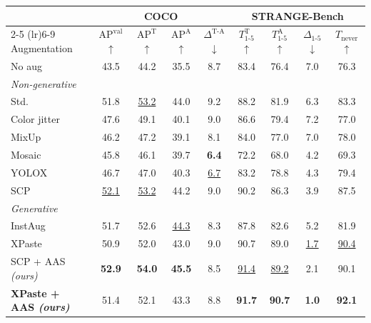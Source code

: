 \begin{tabular}{l cccc cccc}
\toprule
& \multicolumn{4}{c}{\textbf{COCO}} & \multicolumn{4}{c}{\textbf{STRANGE-Bench}} \\
\cmidrule(lr){2-5} \cmidrule(lr){6-9}
Augmentation & $\text{AP}^{\text{val}}$ $\uparrow$ & $\text{AP}^{\text{T}}$ $\uparrow$ & $\text{AP}^{\text{A}}$ $\uparrow$ & $\Delta^{\text{T-A}}$ $\downarrow$ & $T_{1\text{-}5}^{\text{T}}$ $\uparrow$ & $T_{1\text{-}5}^{\text{A}}$ $\uparrow$ & $\Delta_{1\text{-}5}$ $\downarrow$ & $T_{\text{never}}$ $\uparrow$ \\
\midrule
No aug & 43.5 & 44.2 & 35.5 & 8.7 & 83.4 & 76.4 & 7.0 & 76.3 \\
\midrule
\multicolumn{9}{l}{\emph{Non-generative}} \\
Std. & 51.8 & \underline{53.2} & 44.0 & 9.2 & 88.2 & 81.9 & 6.3 & 83.3 \\
Color jitter & 47.6 & 49.1 & 40.1 & 9.0 & 86.6 & 79.4 & 7.2 & 77.0 \\
MixUp & 46.2 & 47.2 & 39.1 & 8.1 & 84.0 & 77.0 & 7.0 & 78.0 \\
Mosaic & 45.8 & 46.1 & 39.7 & \textbf{6.4} & 72.2 & 68.0 & 4.2 & 69.3 \\
YOLOX & 46.7 & 47.0 & 40.3 & \underline{6.7} & 83.2 & 78.8 & 4.3 & 79.4 \\
SCP & \underline{52.1} & \underline{53.2} & 44.2 & 9.0 & 90.2 & 86.3 & 3.9 & 87.5 \\
\midrule
\multicolumn{9}{l}{\emph{Generative}} \\
InstAug & 51.7 & 52.6 & \underline{44.3} & 8.3 & 87.8 & 82.6 & 5.2 & 81.9 \\
XPaste & 50.9 & 52.0 & 43.0 & 9.0 & 90.7 & 89.0 & \underline{1.7} & \underline{90.4} \\
\midrule
\rowcolor{oursrow} SCP + AAS \emph{(ours)} & \textbf{52.9} & \textbf{54.0} & \textbf{45.5} & 8.5 & \underline{91.4} & \underline{89.2} & 2.1 & 90.1 \\
\rowcolor{oursrow} \textbf{XPaste + AAS \emph{(ours)}} & 51.4 & 52.1 & 43.3 & 8.8 & \textbf{91.7} & \textbf{90.7} & \textbf{1.0} & \textbf{92.1} \\
\bottomrule
\end{tabular}

